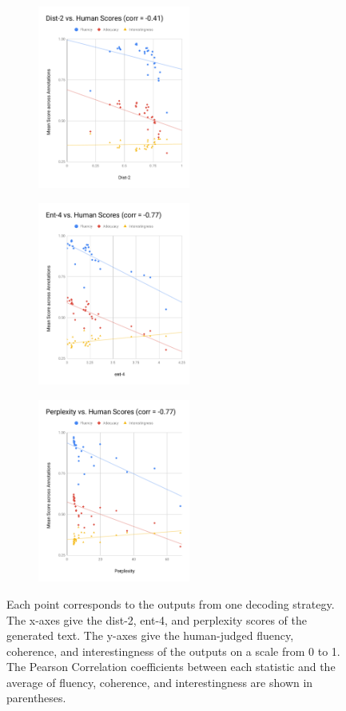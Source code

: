 \begin{itemize}
\begin{figure}[ht]
    \centering
    \begin{subfigure}[l]{5cm}
        \includegraphics[width=5cm]{figures/dist2_vs_human.pdf}
    \end{subfigure}
    \begin{subfigure}[l]{5cm}
        \includegraphics[width=5cm]{figures/ent4_vs_human.pdf}
    \end{subfigure}
    \begin{subfigure}[l]{5cm}
        \includegraphics[width=5cm]{figures/perplexity_vs_human.pdf}
    \end{subfigure}
    \caption{Each point corresponds to the outputs from one decoding strategy. 
     The x-axes give the dist-2, ent-4, and perplexity scores of the generated text.
     The y-axes give the human-judged fluency, coherence, and interestingness of the outputs on a scale from 0 to 1.
     The Pearson Correlation coefficients between each statistic and the average of fluency, coherence, and interestingness are shown in parentheses.}
    \label{fig:correlations}
\end{figure}


\end{itemize}
